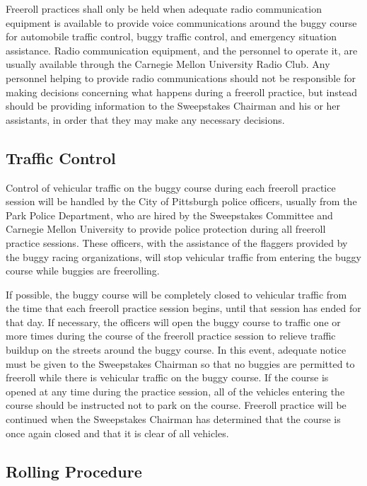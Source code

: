 	Freeroll practices shall only be held when adequate radio communication
	equipment is available to provide voice communications around the buggy course
	for automobile traffic control, buggy traffic control, and emergency situation
	assistance. Radio communication equipment, and the personnel to operate it, are
	usually available through the Carnegie Mellon University Radio Club. Any
	personnel helping to provide radio communications should not be responsible for
	making decisions concerning what happens during a freeroll practice, but
	instead should be providing information to the Sweepstakes Chairman and his or
	her assistants, in order that they may make any necessary decisions.

\subsection{Traffic Control}

	Control of vehicular traffic on the buggy course during each freeroll practice
	session will be handled by the City of Pittsburgh police officers, usually from
	the Park Police Department, who are hired by the Sweepstakes Committee and
	Carnegie Mellon University to provide police protection during all freeroll
	practice sessions. These officers, with the assistance of the flaggers provided
	by the buggy racing organizations, will stop vehicular traffic from entering
	the buggy course while buggies are freerolling.

	If possible, the buggy course will be completely closed to vehicular traffic
	from the time that each freeroll practice session begins, until that session
	has ended for that day. If necessary, the officers will open the buggy course
	to traffic one or more times during the course of the freeroll practice session
	to relieve traffic buildup on the streets around the buggy course. In this
	event, adequate notice must be given to the Sweepstakes Chairman so that no
	buggies are permitted to freeroll while there is vehicular traffic on the buggy
	course. If the course is opened at any time during the practice session, all of
	the vehicles entering the course should be instructed not to park on the
	course. Freeroll practice will be continued when the Sweepstakes Chairman has
	determined that the course is once again closed and that it is clear of all
	vehicles.

\subsection{Rolling Procedure}

